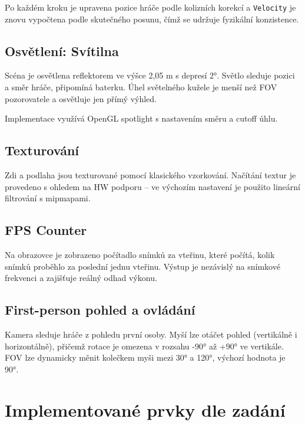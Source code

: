 \documentclass[12pt,a4paper]{article}
\begin{document}
Po každém kroku je upravena pozice hráče podle kolizních korekcí a \texttt{Velocity} je znovu vypočtena podle skutečného posunu, čímž se udržuje fyzikální konzistence.

\subsection*{Osvětlení: Svítilna}
Scéna je osvětlena reflektorem ve výšce 2{,}05 m s depresí 2°. Světlo sleduje pozici a směr hráče, připomíná baterku. Úhel světelného kužele je menší než FOV pozorovatele a osvětluje jen přímý výhled.

Implementace využívá OpenGL spotlight s nastavením směru a cutoff úhlu.

\subsection*{Texturování}
Zdi a podlaha jsou texturované pomocí klasického vzorkování. Načítání textur je provedeno s ohledem na HW podporu – ve výchozím nastavení je použito lineární filtrování s mipmapami.

\subsection*{FPS Counter}
Na obrazovce je zobrazeno počítadlo snímků za vteřinu, které počítá, kolik snímků proběhlo za poslední jednu vteřinu. Výstup je nezávislý na snímkové frekvenci a zajišťuje reálný odhad výkonu.

\subsection*{First-person pohled a ovládání}
Kamera sleduje hráče z pohledu první osoby. Myší lze otáčet pohled (vertikálně i horizontálně), přičemž rotace je omezena v rozsahu -90° až +90° ve vertikále. FOV lze dynamicky měnit kolečkem myši mezi 30° a 120°, výchozí hodnota je 90°.

\section{Implementované prvky dle zadání}
\end{document}

